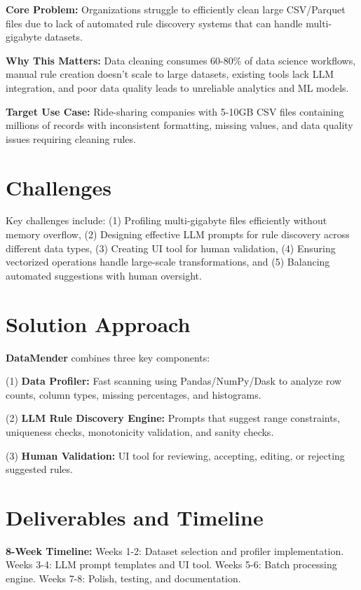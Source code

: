\documentclass[11pt]{article}
\begin{document}
\textbf{Core Problem:} Organizations struggle to efficiently clean large CSV/Parquet files due to lack of automated rule discovery systems that can handle multi-gigabyte datasets.

\textbf{Why This Matters:} Data cleaning consumes 60-80\% of data science workflows, manual rule creation doesn't scale to large datasets, existing tools lack LLM integration, and poor data quality leads to unreliable analytics and ML models.

\textbf{Target Use Case:} Ride-sharing companies with 5-10GB CSV files containing millions of records with inconsistent formatting, missing values, and data quality issues requiring cleaning rules.

\section{\color{primaryblue}Challenges}

Key challenges include: (1) Profiling multi-gigabyte files efficiently without memory overflow, (2) Designing effective LLM prompts for rule discovery across different data types, (3) Creating UI tool for human validation, (4) Ensuring vectorized operations handle large-scale transformations, and (5) Balancing automated suggestions with human oversight.

\section{\color{primaryblue}Solution Approach}

\textbf{DataMender} combines three key components:

(1) \textbf{Data Profiler:} Fast scanning using Pandas/NumPy/Dask to analyze row counts, column types, missing percentages, and histograms.

(2) \textbf{LLM Rule Discovery Engine:} Prompts that suggest range constraints, uniqueness checks, monotonicity validation, and sanity checks.

(3) \textbf{Human Validation:} UI tool for reviewing, accepting, editing, or rejecting suggested rules.


\section{\color{primaryblue}Deliverables and Timeline}

\textbf{8-Week Timeline:} Weeks 1-2: Dataset selection and profiler implementation. Weeks 3-4: LLM prompt templates and UI tool. Weeks 5-6: Batch processing engine. Weeks 7-8: Polish, testing, and documentation.
\end{document}
